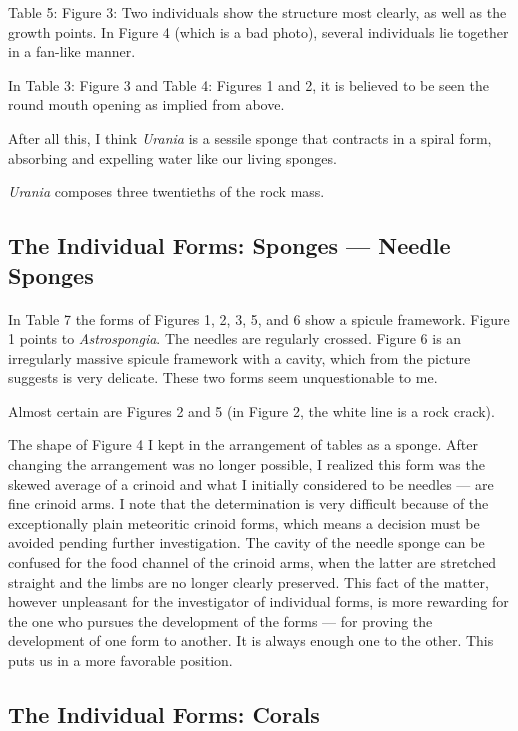 \documentclass[a4paper, 12pt, oneside]{article}
\begin{document}
Table 5: Figure 3: Two individuals show the structure most clearly, as well as the growth points. In Figure 4 (which is a bad photo), several individuals lie together in a fan-like manner.

In Table 3: Figure 3 and Table 4: Figures 1 and 2, it is believed to be seen the round mouth opening as implied from above.

After all this, I think \emph{Urania} is a sessile sponge that contracts in a spiral form, absorbing and expelling water like our living sponges.

\emph{Urania} composes three twentieths of the rock mass.
\clearpage
\subsection{The Individual Forms: Sponges --- Needle Sponges}
\paragraph*{}
In Table 7 the forms of Figures 1, 2, 3, 5, and 6 show a spicule framework. Figure 1 points to \emph{Astrospongia}. The needles are regularly crossed. Figure 6 is an irregularly massive spicule framework with a cavity, which from the picture suggests is very delicate. These two forms seem unquestionable to me.

Almost certain are Figures 2 and 5 (in Figure 2, the white line is a rock crack).

The shape of Figure 4 I kept in the arrangement of tables as a sponge. After changing the arrangement was no longer possible, I realized this form was the skewed average of a crinoid and what I initially considered to be needles --- are fine crinoid arms. I note that the determination is very difficult because of the exceptionally plain meteoritic crinoid forms, which means a decision must be avoided pending further investigation. The cavity of the needle sponge can be confused for the food channel of the crinoid arms, when the latter are stretched straight and the limbs are no longer clearly preserved. This fact of the matter, however unpleasant for the investigator of individual forms, is more rewarding for the one who pursues the development of the forms --- for proving the development of one form to another. It is always enough one to the other. This puts us in a more favorable position.
\clearpage
\subsection{The Individual Forms: Corals}
\end{document}
